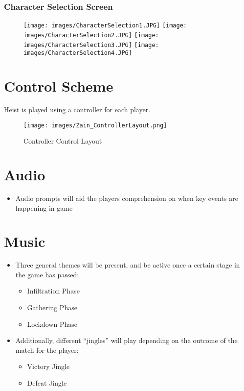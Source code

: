 \documentclass[10pt]{report}
\begin{document}
\subsubsection{Character Selection Screen}

\begin{figure}[H]
    \centering
    \texttt{[image: images/CharacterSelection1.JPG]}
    \texttt{[image: images/CharacterSelection2.JPG]}
    \texttt{[image: images/CharacterSelection3.JPG]}
    \texttt{[image: images/CharacterSelection4.JPG]}
    \caption{}
\end{figure}

\section{Control Scheme}

Heist is played using a controller for each player.

\begin{figure}[H]
    \centering
	\texttt{[image: images/Zain\_ControllerLayout.png]}
    \caption{Controller Control Layout}
\end{figure}

\section{Audio}

\begin{itemize}
    \item Audio prompts will aid the players comprehension on when key events are happening in game
\end{itemize}

\section{Music}

\begin{itemize}
    \item Three general themes will be present, and be active once a certain stage in the game has passed:
    \begin{itemize}
        \item Infiltration Phase
        \item Gathering Phase
        \item Lockdown Phase
    \end{itemize}
    \item Additionally, different “jingles” will play depending on the outcome of the match for the player:
    \begin{itemize}
        \item Victory Jingle
        \item Defeat Jingle
    \end{itemize}
\end{itemize}
\end{document}
